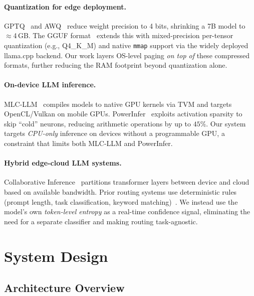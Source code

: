 \documentclass[11pt]{article}
\begin{document}
\paragraph{Quantization for edge deployment.}
GPTQ~\cite{gptq2023} and AWQ~\cite{awq2024} reduce weight precision to
4 bits, shrinking a 7B model to $\approx$4\,GB.
The GGUF format~\cite{gguf2023} extends this with mixed-precision
per-tensor quantization (e.g., Q4\_K\_M) and native \texttt{mmap} support
via the widely deployed llama.cpp backend.
Our work layers OS-level paging \emph{on top of} these compressed formats,
further reducing the RAM footprint beyond quantization alone.

\paragraph{On-device LLM inference.}
MLC-LLM~\cite{mlcllm2023} compiles models to native GPU kernels via
TVM and targets OpenCL/Vulkan on mobile GPUs.
PowerInfer~\cite{powerinfer2023} exploits activation sparsity to skip
``cold'' neurons, reducing arithmetic operations by up to $45\%$.
Our system targets \emph{CPU-only} inference on devices without a
programmable GPU, a constraint that limits both MLC-LLM and PowerInfer.

\paragraph{Hybrid edge-cloud LLM systems.}
Collaborative Inference~\cite{collaborative2025} partitions transformer
layers between device and cloud based on available bandwidth.
Prior routing systems use deterministic rules (prompt length, task
classification, keyword matching)~\cite{edgeroute2024}.
We instead use the model's own \emph{token-level entropy} as a
real-time confidence signal, eliminating the need for a separate
classifier and making routing task-agnostic.

\section{System Design}
\label{sec:design}

\subsection{Architecture Overview}
\label{sec:arch}
\end{document}
